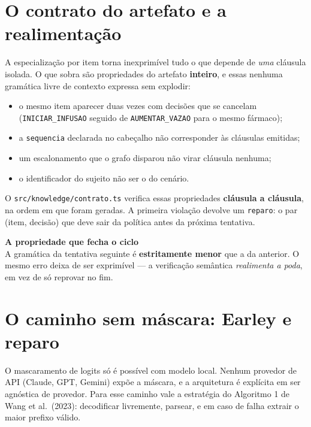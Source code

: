 \documentclass[11pt,a4paper]{article}
\newcommand{\destaque}[2]{%
  \begin{center}
  \begin{minipage}{0.95\linewidth}
  \setlength{\fboxsep}{8pt}%
  \colorbox{corNovoFundo}{%
    \begin{minipage}{\dimexpr\linewidth-16pt\relax}
    \textbf{\textcolor{corNovo}{#1}}\\[2pt]#2
    \end{minipage}}
  \end{minipage}
  \end{center}
}
\newcommand{\arq}[1]{\texttt{\small #1}}
\begin{document}
\section{O contrato do artefato e a realimentação}

A especialização por item torna inexprimível tudo o que depende de \emph{uma}
cláusula isolada. O que sobra são propriedades do artefato \textbf{inteiro}, e
essas nenhuma gramática livre de contexto expressa sem explodir:

\begin{itemize}[leftmargin=*,itemsep=2pt]
\item o mesmo item aparecer duas vezes com decisões que se cancelam
(\texttt{INICIAR\_INFUSAO} seguido de \texttt{AUMENTAR\_VAZAO} para o mesmo
fármaco);
\item a \texttt{sequencia} declarada no cabeçalho não corresponder às cláusulas
emitidas;
\item um escalonamento que o grafo disparou não virar cláusula nenhuma;
\item o identificador do sujeito não ser o do cenário.
\end{itemize}

O \arq{src/knowledge/contrato.ts} verifica essas propriedades \textbf{cláusula a
cláusula}, na ordem em que foram geradas. A primeira violação devolve um
\texttt{reparo}: o par (item, decisão) que deve sair da política antes da
próxima tentativa.

\destaque{A propriedade que fecha o ciclo}{%
A gramática da tentativa seguinte é \textbf{estritamente menor} que a da
anterior. O mesmo erro deixa de ser exprimível --- a verificação semântica
\emph{realimenta a poda}, em vez de só reprovar no fim.}

\section{O caminho sem máscara: Earley e reparo}

O mascaramento de logits só é possível com modelo local. Nenhum provedor de API
(Claude, GPT, Gemini) expõe a máscara, e a arquitetura é explícita em ser
agnóstica de provedor. Para esse caminho vale a estratégia do Algoritmo 1 de
Wang et al.\ (2023): decodificar livremente, parsear, e em caso de falha extrair
o maior prefixo válido.
\end{document}
